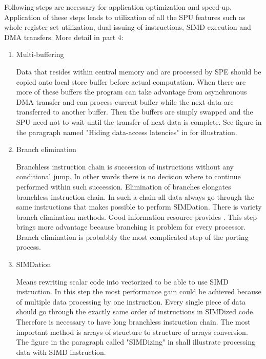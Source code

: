 \par
Following steps are necessary for application optimization and speed-up.
Application of these steps leads to utilization of all the SPU features such as whole register set utilization, dual-issuing of instructions, SIMD execution and DMA transfers.
More detail in \cite{writingPerfApps} part 4:
\\
\begin{enumerate}
\item{Multi-buffering}
\par
Data that resides within central memory and are processed by SPE should be copied onto local store buffer before actual computation.
When there are more of these buffers the program can take advantage from asynchronous DMA transfer and can process current buffer while the next data are transferred to another buffer.
Then the buffers are simply swapped and the SPU need not to wait until the transfer of next data is complete.
See figure in the paragraph named "Hiding data-access latencies" in \cite{compilerOptions} for illustration.

\item{Branch elimination}
\par
Branchless instruction chain is succession of instructions without any conditional jump.
In other words there is no decision where to continue performed within such succession.
Elimination of branches elongates branchless instruction chain.
In such a chain all data always go through the same instructions that makes possible to perform SIMDation.
There is variety branch elimination methods.
Good information resource provides \cite{cellPerformance}.
This step brings more advantage because branching is problem for every processor.
Branch elimination is probabbly the most complicated step of the porting process.

\item{SIMDation}
\par
Means rewriting scalar code into vectorized to be able to use SIMD instruction.
In this step the most performance gain could be achieved because of multiple data processing by one instruction.
Every single piece of data should go through the exactly same order of instructions in SIMDized code.
Therefore is necessary to have long branchless instruction chain.
The most important method is arrays of structure to structure of arrays conversion.
The figure in the paragraph called "SIMDizing" in \cite{compilerOptions} shall illustrate processing data with SIMD instruction.


\end{enumerate}
